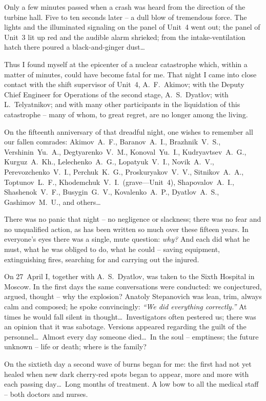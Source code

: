 \documentclass[openright]{bookest}
\begin{document}
Only a few minutes passed when a crash was heard from the direction of the turbine hall. Five to ten seconds later -- a dull blow of tremendous force. The lights and the illuminated signaling on the panel of Unit~4 went out; the panel of Unit~3 lit up red and the audible alarm shrieked; from the intake-ventilation hatch there poured a black-and-ginger dust\ldots

Thus I found myself at the epicenter of a nuclear catastrophe which, within a matter of minutes, could have become fatal for me. That night I came into close contact with the shift supervisor of Unit~4, A.~F.~Akimov; with the Deputy Chief Engineer for Operations of the second stage, A.~S.~Dyatlov; with L.~Telyatnikov; and with many other participants in the liquidation of this catastrophe -- many of whom, to great regret, are no longer among the living.

On the fifteenth anniversary of that dreadful night, one wishes to remember all our fallen comrades:
Akimov~A.~F., Baranov~A.~I., Brazhnik~V.~S., Vershinin~Yu.~A., Degtyarenko~V.~M., Konoval~Yu.~I., Kudryavtsev~A.~G., Kurguz~A.~Kh., Lelechenko~A.~G., Lopatyuk~V.~I., Novik~A.~V., Perevozchenko~V.~I., Perchuk~K.~G., Proskuryakov~V.~V., Sitnikov~A.~A., Toptunov~L.~F., Khodemchuk~V.~I.\ (grave—Unit~4), Shapovalov~A.~I., Shashenok~V.~F., Busygin~G.~V., Kovalenko~A.~P., Dyatlov~A.~S., Gashimov~M.~U., and others\ldots

There was no panic that night -- no negligence or slackness; there was no fear and no unqualified action, as has been written so much over these fifteen years. In everyone's eyes there was a single, mute question: \textit{why?} And each did what he must, what he was obliged to do, what he could -- saving equipment, extinguishing fires, searching for and carrying out the injured.

On 27~April I, together with A.~S.~Dyatlov, was taken to the Sixth Hospital in Moscow. In the first days the same conversations were conducted: we conjectured, argued, thought -- why the explosion? Anatoly Stepanovich was lean, trim, always calm and composed; he spoke convincingly: \textit{``We did everything correctly.''} At times he would fall silent in thought\ldots~Investigators often pestered us; there was an opinion that it was sabotage. Versions appeared regarding the guilt of the personnel\ldots~Almost every day someone died\ldots~In the soul -- emptiness; the future unknown -- life or death; where is the family?

On the sixtieth day a second wave of burns began for me: the first had not yet healed when new dark cherry-red spots began to appear, more and more with each passing day\ldots~Long months of treatment. A low bow to all the medical staff -- both doctors and nurses.
\end{document}
